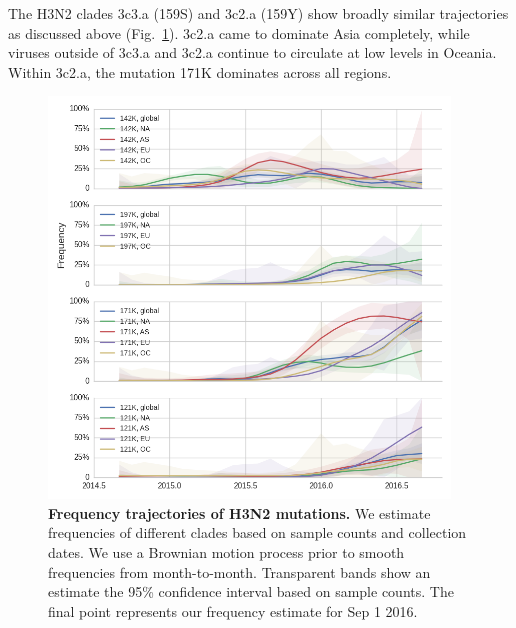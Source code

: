 \documentclass[11pt,oneside,letterpaper]{article}
\begin{document}
\pagebreak

The H3N2 clades 3c3.a (159S) and 3c2.a (159Y) show broadly similar trajectories as discussed above (Fig.\ \ref{H3N2_mutations_all}). 3c2.a came to dominate Asia completely, while viruses outside of 3c3.a and 3c2.a continue to circulate at low levels in Oceania. Within 3c2.a, the mutation 171K dominates across all regions.

\begin{figure}[H]
	\centering
	\includegraphics[width=0.95\textwidth]{../figures/sep-2016/H3N2_mutations_all.png}
	\caption{\textbf{Frequency trajectories of H3N2 mutations.}
	We estimate frequencies of different clades based on sample counts and collection dates.
	We use a Brownian motion process prior to smooth frequencies from month-to-month.
	Transparent bands show an estimate the 95\% confidence interval based on sample counts.
	The final point represents our frequency estimate for Sep 1 2016.
	}
	\label{H3N2_mutations_all}
\end{figure}



\end{document}
